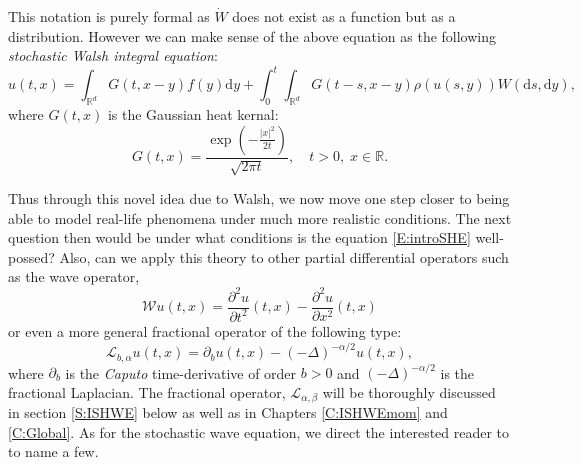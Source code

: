 \documentclass[12pt]{report}
\theoremstyle{plain}
\theoremstyle{definition}
\numberwithin{equation}{section}
\newcommand{\R}{\mathbb{R}}
\newcommand{\ud}{\ensuremath{ \mathrm{d} }}
\begin{document}
	
This notation is purely formal as $\dot{W}$ does not exist as a function but as a distribution. However we can make sense of the above equation as the following {\em stochastic Walsh integral equation}:
	\begin{equation} \label{E:introMsol}
		u(t,x) = \int_{\R^d} G(t, x-y)f(y) \ud y + \int_0^t \int_{\R^d} G(t-s, x-y) \rho(u(s,y)) W(\ud s, \ud y),
	\end{equation}
where $G(t,x)$ is the Gaussian heat kernal:
	\[
		G(t,x) = \frac{\exp\left(- \frac{|x|^2}{2t}\right)}{\sqrt{2 \pi t}}, \quad t > 0, \; x \in \R.
	\]
	
Thus through this novel idea due to Walsh, we now move one step closer to being able to model real-life phenomena under much more realistic conditions. The next question then would be under what conditions is the equation \eqref{E:introSHE} well-possed? Also, can we apply this theory to other partial differential operators such as the wave operator,
	\[
		\mathcal{W}u(t,x) = \frac{\partial^2 u}{\partial t^2}(t,x)  - \frac{\partial^2 u}{\partial x^2}(t,x)
	\]
or even a more general fractional operator of the following type:
	\[
		\mathcal{L}_{b, \alpha}u(t,x) = \partial_b u(t,x) - (-\Delta)^{-\alpha / 2}u(t,x), 
	\]
where $\partial_b$ is the {\em Caputo} time-derivative of order $b > 0$ and $(-\Delta)^{-\alpha / 2}$ is the fractional Laplacian. The fractional operator, $\mathcal{L}_{\alpha, \beta}$ will be thoroughly discussed in section \ref{S:ISHWE} below as well as in Chapters \ref{C:ISHWEmom} and \ref{C:Global}. As for the stochastic wave equation, we direct the interested reader to \cite{dalang.khoshnevisan.ea:09:minicourse, milletsole.global2021, balan.chen.chen:03:invariant} to name a few. 
\end{document}
